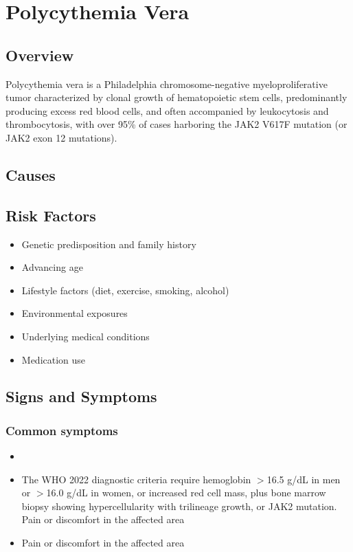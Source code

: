 \chapter{Polycythemia Vera}
\label{sec:Polycythemia Vera}

\section{Overview}
Polycythemia vera is a Philadelphia chromosome-negative myeloproliferative tumor characterized by clonal growth of hematopoietic stem cells, predominantly producing excess red blood cells, and often accompanied by leukocytosis and thrombocytosis, with over 95\% of cases harboring the JAK2 V617F mutation (or JAK2 exon 12 mutations).
\section{Causes}
\section{Risk Factors}

\begin{itemize}[noitemsep]
  \item Genetic predisposition and family history
  \item Advancing age
  \item Lifestyle factors (diet, exercise, smoking, alcohol)
  \item Environmental exposures
  \item Underlying medical conditions
  \item Medication use
\end{itemize}
\section{Signs and Symptoms}

\subsection{Common symptoms}
\begin{itemize}[noitemsep]
  \item \item The WHO 2022 diagnostic criteria require hemoglobin $>$16.5 g/dL in men or $>$16.0 g/dL in women, or increased red cell mass, plus bone marrow biopsy showing hypercellularity with trilineage growth, or JAK2 mutation. Pain or discomfort in the affected area    \item Pain or discomfort in the affected area
  \end{itemize}

